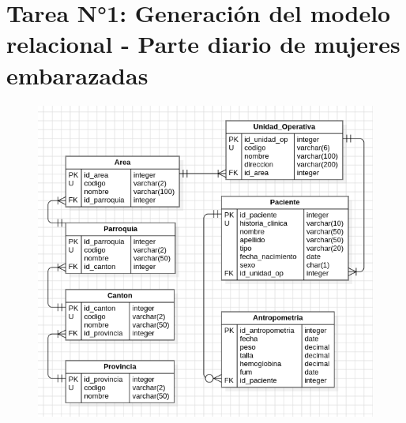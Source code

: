 \documentclass[12pt]{article}
\begin{document}
    

    \section*{\centering \textbf{Tarea N°1: Generación del modelo relacional - Parte diario de mujeres embarazadas}}

    \begin{figure}[!h]
        \centering
        \includegraphics[width=1\textwidth]{ER_Tarea1_ParteDiario.png}
    \end{figure}
\end{document}
